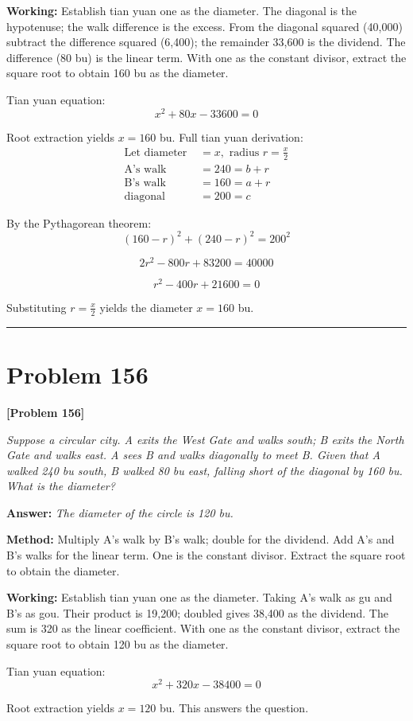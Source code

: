 \documentclass[11pt,a4paper]{book}
\newcommand{\answer}[1]{\noindent\textbf{\color{anacolor}Answer: }\textit{#1}\par}
\newcommand{\method}[1]{\noindent\textbf{\color{methodcolor}Method: }#1\par}
\newcommand{\working}[1]{\noindent\textbf{\color{workcolor}Working: }#1\par}
\newcommand{\shortline}{\noindent\rule{0.5\textwidth}{0.4pt}\par}
\begin{document}
\working{Establish tian yuan one as the diameter. The diagonal is the hypotenuse; the walk difference is the excess. From the diagonal squared (40,000) subtract the difference squared (6,400); the remainder 33,600 is the dividend. The difference (80 bu) is the linear term. With one as the constant divisor, extract the square root to obtain 160 bu as the diameter.

Tian yuan equation:
$$x^2 + 80x - 33600 = 0$$

Root extraction yields $x = 160$ bu. Full tian yuan derivation:
\begin{align*}
\text{Let diameter } &= x, \text{ radius } r = \frac{x}{2} \\
\text{A's walk} &= 240 = b + r \\
\text{B's walk} &= 160 = a + r \\
\text{diagonal} &= 200 = c
\end{align*}

By the Pythagorean theorem:
$$(160 - r)^2 + (240 - r)^2 = 200^2$$

$$2r^2 - 800r + 83200 = 40000$$

$$r^2 - 400r + 21600 = 0$$

Substituting $r = \frac{x}{2}$ yields the diameter $x = 160$ bu.}

\shortline

\section{Problem 156}
\label{sec:prob156}

\noindent\textbf{\color{probcolor}[Problem 156]}

\textit{Suppose a circular city. A exits the West Gate and walks south; B exits the North Gate and walks east. A sees B and walks diagonally to meet B. Given that A walked 240 bu south, B walked 80 bu east, falling short of the diagonal by 160 bu. What is the diameter?}

\answer{The diameter of the circle is 120 bu.}

\method{Multiply A's walk by B's walk; double for the dividend. Add A's and B's walks for the linear term. One is the constant divisor. Extract the square root to obtain the diameter.}

\working{Establish tian yuan one as the diameter. Taking A's walk as gu and B's as gou. Their product is 19,200; doubled gives 38,400 as the dividend. The sum is 320 as the linear coefficient. With one as the constant divisor, extract the square root to obtain 120 bu as the diameter.

Tian yuan equation:
$$x^2 + 320x - 38400 = 0$$

Root extraction yields $x = 120$ bu. This answers the question.}
\end{document}
